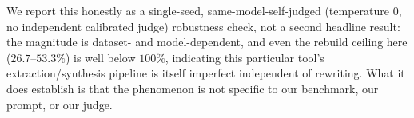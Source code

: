 We report this honestly as a single-seed, same-model-self-judged (temperature $0$, no independent calibrated judge) robustness check, not a second headline result: the magnitude is dataset- and model-dependent, and even the rebuild ceiling here ($26.7$--$53.3\%$) is well below $100\%$, indicating this particular tool's extraction/synthesis pipeline is itself imperfect independent of rewriting. What it does establish is that the phenomenon is not specific to our benchmark, our prompt, or our judge.
